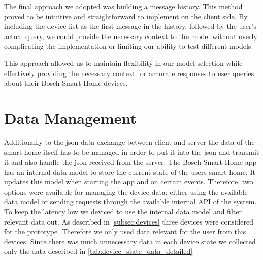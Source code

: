 The final approach we adopted was building a message history. This method proved to be intuitive and straightforward to implement on the client side. By including the device list as the first message in the history, followed by the user's actual query, we could provide the necessary context to the model without overly complicating the implementation or limiting our ability to test different models.

This approach allowed us to maintain flexibility in our model selection while effectively providing the necessary context for accurate responses to user queries about their Bosch Smart Home devices.



\section{Data Management}
Additionally to the \gls{json} data exchange between client and server the data of the smart home itself has to be managed in order to put it into the \gls{json} and transmit it and also handle the \gls{json} received from the server.
The Bosch Smart Home app has an internal data model to store the current state of the users smart home. It updates this model when starting the app and on certain events.
Therefore, two options were available for managing the device data: either using the available data model or sending requests through the available internal API of the system.
To keep the latency low we deviced to use the internal data model and filter relevant data out. As described in \cref{subsec:devices} three devices were considered for the prototype.
Therefore we only used data relevant for the user from this devices. Since there was much unnecessary data in each device state we collected only the data described in \cref{tab:device_state_data_detailed}
